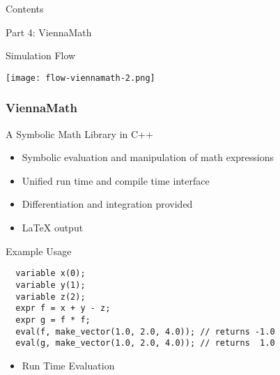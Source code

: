 


\begin{frame}{Contents}
  \begin{center}
   \Large Part 4: ViennaMath
  \end{center}
\end{frame}

\begin{frame}{Simulation Flow}
  \begin{center}
   \texttt{[image: flow-viennamath-2.png]}
  \end{center}
\end{frame}





\begin{frame}[fragile]
\frametitle{ViennaMath}

 \begin{block}{A Symbolic Math Library in C++}
   \begin{itemize}
    \item Symbolic evaluation and manipulation of math expressions
    \item Unified run time and compile time interface
    \item Differentiation and integration provided
    \item {\LaTeX} output
   \end{itemize}
 \end{block}

 \begin{block}{Example Usage}
\begin{lstlisting}
  variable x(0);
  variable y(1);
  variable z(2);
  expr f = x + y - z;
  expr g = f * f;
  eval(f, make_vector(1.0, 2.0, 4.0)); // returns -1.0
  eval(g, make_vector(1.0, 2.0, 4.0)); // returns  1.0
\end{lstlisting} 
   \begin{itemize}
    \item Run Time Evaluation
   \end{itemize}
 \end{block}
\end{frame}




